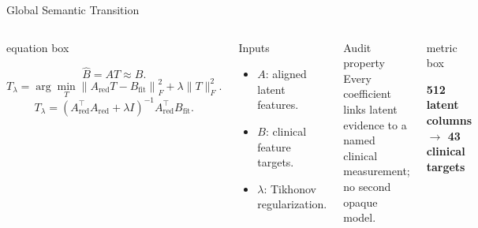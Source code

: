 \documentclass[aspectratio=169,xcolor=dvipsnames]{beamer}
\newcommand{\compactitem}{\setlength{\itemsep}{0.28em}\setlength{\parskip}{0pt}}
\newcommand{\metric}[1]{%
  \begin{beamercolorbox}[wd=\linewidth,sep=0.45em,center]{metric box}%
    {\small\bfseries #1\par}%
  \end{beamercolorbox}%
}
\begin{document}
\begin{frame}{Global Semantic Transition}
\small
\begin{columns}[T,onlytextwidth]
  \begin{beamercolorbox}[wd=\linewidth,sep=0.55em]{equation box}
  {\small
  \[
    \widehat{B}=AT\approx B .
    \tag{2}
  \]
  \[
    T_{\lambda}=\arg\min_T
    \left\lVert A_{\mathrm{red}}T-B_{\mathrm{fit}}\right\rVert_F^2
    +\lambda\lVert T\rVert_F^2 .
    \tag{3}
  \]
  \[
    T_{\lambda}=
    \left(A_{\mathrm{red}}^{\top}A_{\mathrm{red}}+\lambda I\right)^{-1}
    A_{\mathrm{red}}^{\top}B_{\mathrm{fit}} .
    \tag{4}
  \]
  \par}
  \end{beamercolorbox}

  \begin{block}{Inputs}
  \scriptsize
  \begin{itemize}\compactitem
    \item $A$: aligned latent features.
    \item $B$: clinical feature targets.
    \item $\lambda$: Tikhonov regularization.
  \end{itemize}
  \end{block}
  \begin{exampleblock}{Audit property}
  \scriptsize
  Every coefficient links latent evidence to a named clinical measurement;
  no second opaque model.
  \end{exampleblock}
  \vspace{0.15em}
  \metric{512 latent columns $\rightarrow$ 43 clinical targets}
\end{columns}
\end{frame}
\end{document}
